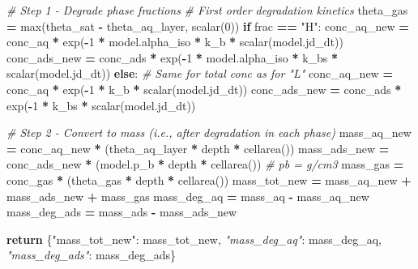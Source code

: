 \documentclass[]{article}
\newenvironment{Shaded}{\begin{snugshade}}{\end{snugshade}}
\newcommand{\DecValTok}[1]{\textcolor[rgb]{0.00,0.00,0.81}{{#1}}}
\newcommand{\StringTok}[1]{\textcolor[rgb]{0.31,0.60,0.02}{{#1}}}
\newcommand{\CommentTok}[1]{\textcolor[rgb]{0.56,0.35,0.01}{\textit{{#1}}}}
\newcommand{\ControlFlowTok}[1]{\textcolor[rgb]{0.13,0.29,0.53}{\textbf{{#1}}}}
\newcommand{\OperatorTok}[1]{\textcolor[rgb]{0.81,0.36,0.00}{\textbf{{#1}}}}
\newcommand{\BuiltInTok}[1]{{#1}}
\newcommand{\NormalTok}[1]{{#1}}
\begin{document}
\begin{Shaded}
\begin{Highlighting}[]
    \CommentTok{# Step 1 - Degrade phase fractions}
    \CommentTok{# First order degradation kinetics}
    \NormalTok{theta_gas }\OperatorTok{=} \BuiltInTok{max}\NormalTok{(theta_sat }\OperatorTok{-} \NormalTok{theta_aq_layer, scalar(}\DecValTok{0}\NormalTok{))}
    \ControlFlowTok{if} \NormalTok{frac }\OperatorTok{==} \StringTok{"H"}\NormalTok{:}
        \NormalTok{conc_aq_new }\OperatorTok{=} \NormalTok{conc_aq }\OperatorTok{*} \NormalTok{exp(}\OperatorTok{-}\DecValTok{1} \OperatorTok{*} \NormalTok{model.alpha_iso }\OperatorTok{*} \NormalTok{k_b }\OperatorTok{*} \NormalTok{scalar(model.jd_dt))}
        \NormalTok{conc_ads_new }\OperatorTok{=} \NormalTok{conc_ads }\OperatorTok{*} \NormalTok{exp(}\OperatorTok{-}\DecValTok{1} \OperatorTok{*} \NormalTok{model.alpha_iso }\OperatorTok{*} \NormalTok{k_bs }\OperatorTok{*} \NormalTok{scalar(model.jd_dt))}
    \ControlFlowTok{else}\NormalTok{:  }\CommentTok{# Same for total conc as for "L"}
        \NormalTok{conc_aq_new }\OperatorTok{=} \NormalTok{conc_aq }\OperatorTok{*} \NormalTok{exp(}\OperatorTok{-}\DecValTok{1} \OperatorTok{*} \NormalTok{k_b }\OperatorTok{*} \NormalTok{scalar(model.jd_dt))}
        \NormalTok{conc_ads_new }\OperatorTok{=} \NormalTok{conc_ads }\OperatorTok{*} \NormalTok{exp(}\OperatorTok{-}\DecValTok{1} \OperatorTok{*} \NormalTok{k_bs }\OperatorTok{*} \NormalTok{scalar(model.jd_dt))}

    \CommentTok{# Step 2 - Convert to mass (i.e., after degradation in each phase)}
    \NormalTok{mass_aq_new }\OperatorTok{=} \NormalTok{conc_aq_new }\OperatorTok{*} \NormalTok{(theta_aq_layer }\OperatorTok{*} \NormalTok{depth }\OperatorTok{*} \NormalTok{cellarea())}
    \NormalTok{mass_ads_new }\OperatorTok{=} \NormalTok{conc_ads_new }\OperatorTok{*} \NormalTok{(model.p_b }\OperatorTok{*} \NormalTok{depth }\OperatorTok{*} \NormalTok{cellarea())  }\CommentTok{# pb = g/cm3}
    \NormalTok{mass_gas }\OperatorTok{=} \NormalTok{conc_gas }\OperatorTok{*} \NormalTok{(theta_gas }\OperatorTok{*} \NormalTok{depth }\OperatorTok{*} \NormalTok{cellarea())}
    \NormalTok{mass_tot_new }\OperatorTok{=} \NormalTok{mass_aq_new }\OperatorTok{+} \NormalTok{mass_ads_new }\OperatorTok{+} \NormalTok{mass_gas}
    \NormalTok{mass_deg_aq }\OperatorTok{=} \NormalTok{mass_aq }\OperatorTok{-} \NormalTok{mass_aq_new}
    \NormalTok{mass_deg_ads }\OperatorTok{=} \NormalTok{mass_ads }\OperatorTok{-} \NormalTok{mass_ads_new}

    \ControlFlowTok{return} \NormalTok{\{}\StringTok{"mass_tot_new"}\NormalTok{: mass_tot_new,}
            \CommentTok{"mass_deg_aq"}\NormalTok{: mass_deg_aq,}
            \CommentTok{"mass_deg_ads"}\NormalTok{: mass_deg_ads\}}
\end{Highlighting}
\end{Shaded}
\end{document}
